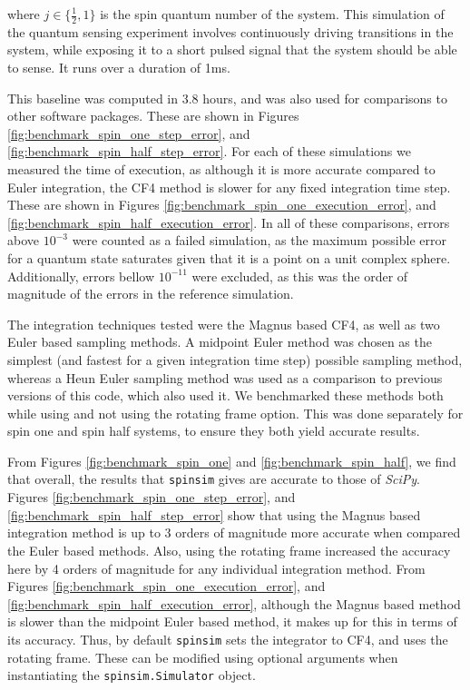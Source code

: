 \documentclass{jors}
\begin{document}
			where \(j \in \{\frac12, 1\}\) is the spin quantum number of the system. This simulation of the quantum sensing experiment involves continuously driving transitions in the system, while exposing it to a short pulsed signal that the system should be able to sense. It runs over a duration of 1ms.

			This baseline was computed in 3.8 hours, and was also used for comparisons to other software packages. These are shown in Figures \ref{fig:benchmark_spin_one_step_error}, and \ref{fig:benchmark_spin_half_step_error}. For each of these simulations we measured the time of execution, as although it is more accurate compared to Euler integration, the CF4 method is slower for any fixed integration time step. These are shown in Figures \ref{fig:benchmark_spin_one_execution_error}, and \ref{fig:benchmark_spin_half_execution_error}. In all of these comparisons, errors above \(10^{-3}\) were counted as a failed simulation, as the maximum possible error for a quantum state saturates given that it is a point on a unit complex sphere. Additionally, errors bellow \(10^{-11}\) were excluded, as this was the order of magnitude of the errors in the reference simulation.


			The integration techniques tested were the Magnus based CF4, as well as two Euler based sampling methods. A midpoint Euler method was chosen as the simplest (and fastest for a given integration time step)  possible sampling method, whereas a Heun Euler sampling method was used as a comparison to previous versions of this code, which also used it. We benchmarked these methods both while using and not using the rotating frame option. This was done separately for spin one and spin half systems, to ensure they both yield accurate results.

			From Figures \ref{fig:benchmark_spin_one} and \ref{fig:benchmark_spin_half}, we find that overall, the results that \texttt{spinsim} gives are accurate to those of \emph{SciPy}. Figures \ref{fig:benchmark_spin_one_step_error}, and \ref{fig:benchmark_spin_half_step_error} show that using the Magnus based integration method is up to 3 orders of magnitude more accurate when compared the Euler based methods. Also, using the rotating frame increased the accuracy here by 4 orders of magnitude for any individual integration method. From Figures \ref{fig:benchmark_spin_one_execution_error}, and \ref{fig:benchmark_spin_half_execution_error}, although the Magnus based method is slower than the midpoint Euler based method, it makes up for this in terms of its accuracy. Thus, by default \texttt{spinsim} sets the integrator to CF4, and uses the rotating frame. These can be modified using optional arguments when instantiating the \texttt{spinsim.Simulator} object.
\end{document}
